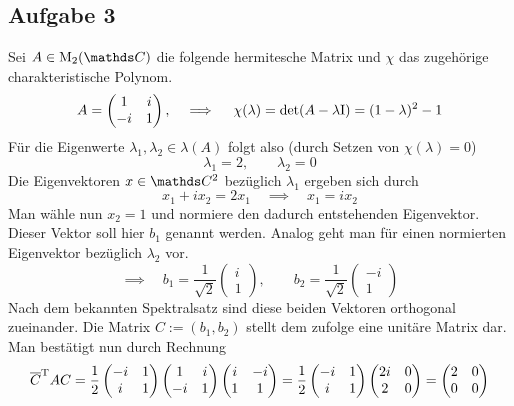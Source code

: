 
	\subsection*{Aufgabe 3} %
	\label{sub:aufgabe_3}
	
		Sei $A\in\m{M}_2(\SC)$ die folgende hermitesche Matrix und $\chi$ das zugehörige charakteristische Polynom.
		\[
			A =
			\begin{pmatrix}
				1 & i \\
				-i & 1
			\end{pmatrix}
			,\quad \implies \quad \chi(\lambda) = \det(A-\lambda\mathrm{I}) = (1-\lambda)^2 -1
		\]
		Für die Eigenwerte $\lambda_1,\lambda_2\in\lambda(A)$ folgt also (durch Setzen von $\chi(\lambda)=0$)
		\[ \lambda_1=2, \qquad \lambda_2=0 \]
		Die Eigenvektoren $x\in\SC^2$ bezüglich $\lambda_1$ ergeben sich durch
		\[ x_1 + ix_2 = 2x_1 \quad \implies \quad x_1 = ix_2 \]
		Man wähle nun $x_2=1$ und normiere den dadurch entstehenden Eigenvektor.
		Dieser Vektor soll hier $b_1$ genannt werden.
		Analog geht man für einen normierten Eigenvektor bezüglich $\lambda_2$ vor.
		\[ \implies \quad b_1 = \frac{1}{\sqrt{2}} \begin{pmatrix} i \\ 1 \end{pmatrix},\qquad b_2 = \frac{1}{\sqrt{2}}\begin{pmatrix} -i \\ 1 \end{pmatrix} \]
		Nach dem bekannten Spektralsatz sind diese beiden Vektoren orthogonal zueinander.
		Die Matrix $C:=(b_1,b_2)$ stellt dem zufolge eine unitäre Matrix dar.
		Man bestätigt nun durch Rechnung
		\[
			{\overline{C}}^{\mathrm{T}}AC = \frac{1}{2}
			\begin{pmatrix}
				-i & 1 \\
				i & 1
			\end{pmatrix}
			\begin{pmatrix}
				1 & i \\
				-i & 1
			\end{pmatrix}
			\begin{pmatrix}
				i & -i \\
				1 & 1
			\end{pmatrix}
			= \frac{1}{2}
			\begin{pmatrix}
				-i & 1 \\
				i & 1
			\end{pmatrix}
			\begin{pmatrix}
				2i & 0 \\
				2 & 0
			\end{pmatrix}
			=
			\begin{pmatrix}
				2 & 0 \\
				0 & 0
			\end{pmatrix}
		\]

